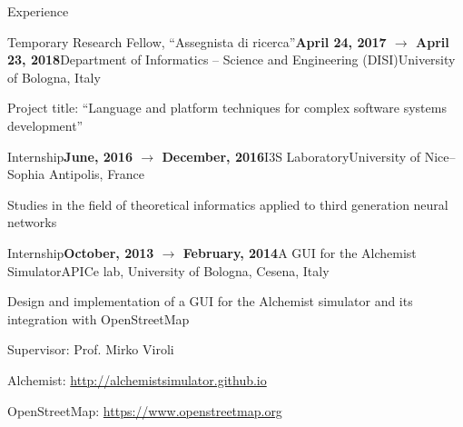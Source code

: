 \documentclass{resume} %
\begin{document}
\begin{rSection}{Experience}
	
\begin{rSubsection}{Temporary Research Fellow, ``Assegnista di ricerca''}{\textbf{April 24, 2017 $\rightarrow$ April 23, 2018}}{Department of Informatics -- Science and Engineering (DISI)}{University of Bologna, Italy}
	\item Project title: ``Language and platform techniques for complex software systems development''
\end{rSubsection}

\begin{rSubsection}{Internship}{\textbf{June, 2016 $\rightarrow$ December, 2016}}{I3S Laboratory}{University of Nice--Sophia Antipolis, France}
	\item Studies in the field of theoretical informatics applied to third generation neural networks
\end{rSubsection}

\begin{rSubsection}{Internship}{\textbf{October, 2013 $\rightarrow$ February, 2014}}{A GUI for the Alchemist Simulator}{APICe lab, University of Bologna, Cesena, Italy}
\item Design and implementation of a GUI for the Alchemist simulator and its integration with OpenStreetMap
\item Supervisor: Prof. Mirko Viroli
\item Alchemist: \url{http://alchemistsimulator.github.io}
\item OpenStreetMap: \url{https://www.openstreetmap.org}
\end{rSubsection}

\end{rSection}

\clearpage

\end{document}
